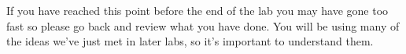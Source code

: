 If you have reached this point before the end of the lab you may have gone too fast so please go back and review what you have done. You will be using many of the ideas we've just met in later labs, so it's important to understand them.






